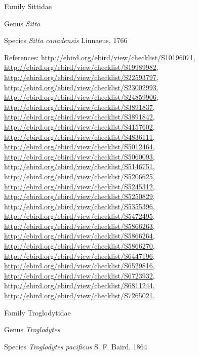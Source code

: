 \documentclass[9pt, article]{memoir}
\begin{document}
\begin{multicols}{2}
\vspace{6pt}\noindent\hspace{24pt}Family Sittidae


\vspace{6pt}\noindent\hspace{30pt}Genus \textit{Sitta}


\vspace{6pt}\noindent\hspace{36pt}Species \textit{Sitta canadensis} Linnaeus, 1766


\vspace{6pt}References: 
\url{http://ebird.org/ebird/view/checklist/S10196071}, 
\url{http://ebird.org/ebird/view/checklist/S19989982}, 
\url{http://ebird.org/ebird/view/checklist/S22593797}, 
\url{http://ebird.org/ebird/view/checklist/S23002993}, 
\url{http://ebird.org/ebird/view/checklist/S24859906}, 
\url{http://ebird.org/ebird/view/checklist/S3891837}, 
\url{http://ebird.org/ebird/view/checklist/S3891842}, 
\url{http://ebird.org/ebird/view/checklist/S4157602}, 
\url{http://ebird.org/ebird/view/checklist/S4836111}, 
\url{http://ebird.org/ebird/view/checklist/S5012464}, 
\url{http://ebird.org/ebird/view/checklist/S5060093}, 
\url{http://ebird.org/ebird/view/checklist/S5146751}, 
\url{http://ebird.org/ebird/view/checklist/S5206625}, 
\url{http://ebird.org/ebird/view/checklist/S5245312}, 
\url{http://ebird.org/ebird/view/checklist/S5250829}, 
\url{http://ebird.org/ebird/view/checklist/S5355396}, 
\url{http://ebird.org/ebird/view/checklist/S5472495}, 
\url{http://ebird.org/ebird/view/checklist/S5866263}, 
\url{http://ebird.org/ebird/view/checklist/S5866264}, 
\url{http://ebird.org/ebird/view/checklist/S5866270}, 
\url{http://ebird.org/ebird/view/checklist/S6447196}, 
\url{http://ebird.org/ebird/view/checklist/S6529816}, 
\url{http://ebird.org/ebird/view/checklist/S6723932}, 
\url{http://ebird.org/ebird/view/checklist/S6811244}, 
\url{http://ebird.org/ebird/view/checklist/S7265021}.

\vspace{6pt}\noindent\hspace{24pt}Family Troglodytidae


\vspace{6pt}\noindent\hspace{30pt}Genus \textit{Troglodytes}


\vspace{6pt}\noindent\hspace{36pt}Species \textit{Troglodytes pacificus} S. F. Baird, 1864



\end{multicols}
\end{document}
